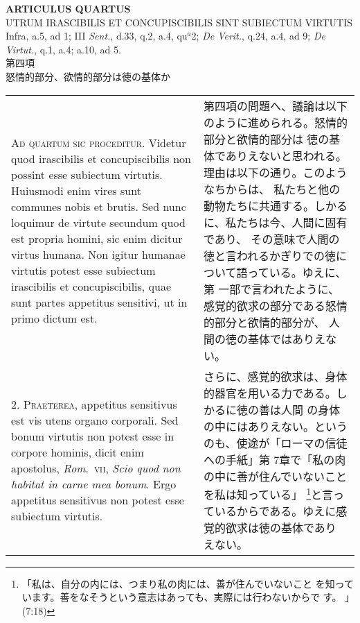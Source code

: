 \documentclass[10pt]{jsarticle}
\begin{document}
\begin{center}
{\Large {\bf ARTICULUS QUARTUS}}\\
{\large UTRUM IRASCIBILIS ET CONCUPISCIBILIS SINT SUBIECTUM VIRTUTIS}\\
{\footnotesize Infra, a.5, ad 1; III {\itshape Sent.}, d.33, q.2, a.4, qu$^{a}$2; {\itshape De Verit.}, q.24, a.4, ad 9; {\itshape De Virtut.}, q.1, a.4; a.10, ad 5.}\\
{\Large 第四項\\怒情的部分、欲情的部分は徳の基体か}
\end{center}

\begin{longtable}{p{21em}p{21em}}

{\scshape Ad quartum sic proceditur}. Videtur quod irascibilis et
concupiscibilis non possint esse subiectum virtutis. Huiusmodi enim
vires sunt communes nobis et brutis. Sed nunc loquimur de virtute
secundum quod est propria homini, sic enim dicitur virtus humana. Non
igitur humanae virtutis potest esse subiectum irascibilis et
concupiscibilis, quae sunt partes appetitus sensitivi, ut in primo
dictum est.

&

第四項の問題へ、議論は以下のように進められる。怒情的部分と欲情的部分は
徳の基体でありえないと思われる。理由は以下の通り。このようなちからは、
私たちと他の動物たちに共通する。しかるに、私たちは今、人間に固有であり、
その意味で人間の徳と言われるかぎりでの徳について語っている。ゆえに、第
一部で言われたように、感覚的欲求の部分である怒情的部分と欲情的部分が、
人間の徳の基体ではありえない。

\\

2. {\scshape Praeterea}, appetitus sensitivus est vis utens organo
corporali. Sed bonum virtutis non potest esse in corpore hominis,
dicit enim apostolus, {\itshape Rom}.~{\scshape vii}, {\itshape Scio
quod non habitat in carne mea bonum}. Ergo appetitus sensitivus non
potest esse subiectum virtutis.

&

さらに、感覚的欲求は、身体的器官を用いる力である。しかるに徳の善は人間
の身体の中にはありえない。というのも、使途が「ローマの信徒への手紙」第
7章で「私の肉の中に善が住んでいないことを私は知っている」
\footnote{「私は、自分の内には、つまり私の肉には、善が住んでいないこと
を知っています。善をなそうという意志はあっても、実際には行わないからで
す。 」(7:18)}と言っているからである。ゆえに感覚的欲求は徳の基体であり
えない。


\end{longtable}
\end{document}

